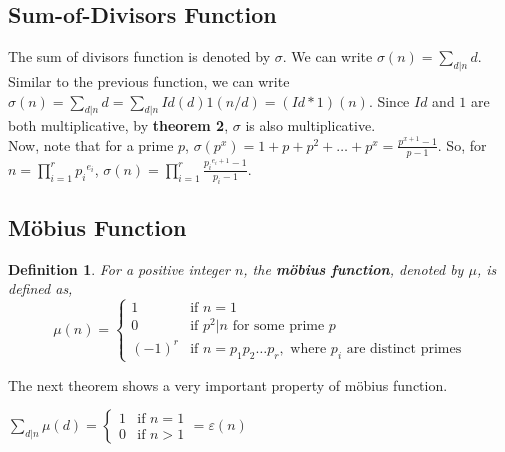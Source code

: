 \documentclass[11pt]{article}
\newtheorem{definition}{Definition}[section]
\begin{document}
\subsection{Sum-of-Divisors Function}
The sum of divisors function is denoted by $\sigma$. We can write $\sigma(n) = \sum_{d|n} d$. Similar to the previous function, we can write $\sigma(n) = \sum_{d|n} d = \sum_{d|n} Id(d) 1(n / d) = (Id * 1)(n)$. Since $Id$ and $1$ are both multiplicative, by \textbf{theorem 2}, $\sigma$ is also multiplicative. \\
Now, note that for a prime $p$, $\sigma(p^x) = 1 + p + p^2 + \dots + p^x = \frac{p^{x+1} - 1}{p - 1}$. So, for $n = \prod_{i = 1}^{r} {p_i}^{e_i}$, $\sigma(n) = \prod_{i = 1}^{r} \frac{{p_i}^{e_i + 1} - 1}{p_i - 1}$. 
\subsection{M\"{o}bius Function}
\begin{definition}
  For a positive integer $n$, the \textbf{m\"{o}bius function}, denoted by $\mu$, is defined as,
  $$\mu(n) = \begin{cases}
    1 & \text{if } n = 1 \\
    0 & \text{if } p^2 | n \text{ for some prime } p\\
    (-1)^r & \text{if } n = p_1 p_2 \dots p_r, \text{ where } p_i \text{ are distinct primes}
    \end{cases}$$
\end{definition}
The next theorem shows a very important property of m\"{o}bius function.
\begin{theorem}
  $\sum_{d | n} \mu(d) = 
  \begin{cases}
    1 & \text{if } n = 1 \\
    0 & \text{if } n > 1
  \end{cases} = \varepsilon(n)
  $
\end{theorem}
\end{document}
